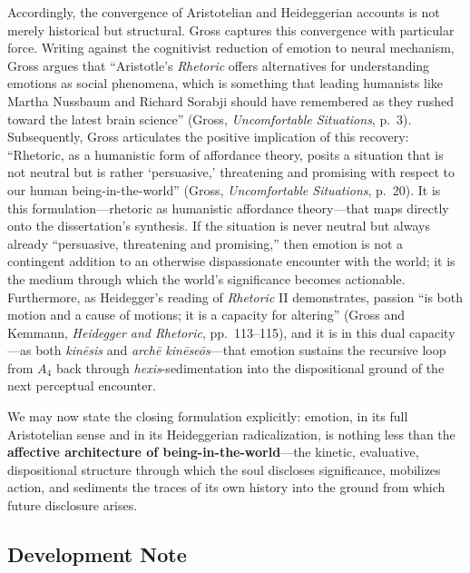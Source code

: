 \documentclass{article}
\begin{document}
Accordingly, the convergence of Aristotelian and Heideggerian accounts is not merely historical but structural. Gross captures this convergence with particular force. Writing against the cognitivist reduction of emotion to neural mechanism, Gross argues that ``Aristotle's \textit{Rhetoric} offers alternatives for understanding emotions as social phenomena, which is something that leading humanists like Martha Nussbaum and Richard Sorabji should have remembered as they rushed toward the latest brain science'' (Gross, \textit{Uncomfortable Situations}, p.~3). Subsequently, Gross articulates the positive implication of this recovery: ``Rhetoric, as a humanistic form of affordance theory, posits a situation that is not neutral but is rather `persuasive,' threatening and promising with respect to our human being-in-the-world'' (Gross, \textit{Uncomfortable Situations}, p.~20). It is this formulation---rhetoric as humanistic affordance theory---that maps directly onto the dissertation's synthesis. If the situation is never neutral but always already ``persuasive, threatening and promising,'' then emotion is not a contingent addition to an otherwise dispassionate encounter with the world; it is the medium through which the world's significance becomes actionable. Furthermore, as Heidegger's reading of \textit{Rhetoric} II demonstrates, passion ``is both motion and a cause of motions; it is a capacity for altering'' (Gross and Kemmann, \textit{Heidegger and Rhetoric}, pp.~113--115), and it is in this dual capacity---as both \textit{kinēsis} and \textit{archē kinēseōs}---that emotion sustains the recursive loop from $A_4$ back through \textit{hexis}-sedimentation into the dispositional ground of the next perceptual encounter.

We may now state the closing formulation explicitly: emotion, in its full Aristotelian sense and in its Heideggerian radicalization, is nothing less than the \textbf{affective architecture of being-in-the-world}---the kinetic, evaluative, dispositional structure through which the soul discloses significance, mobilizes action, and sediments the traces of its own history into the ground from which future disclosure arises.


\subsection*{Development Note}
\end{document}
